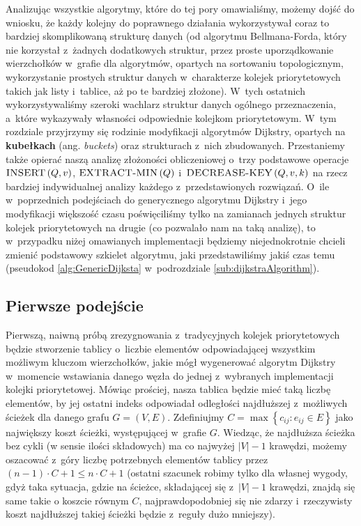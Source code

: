 Analizując wszystkie algorytmy, które do tej pory omawialiśmy, możemy dojść do wniosku, że każdy kolejny do poprawnego działania wykorzystywał coraz to bardziej skomplikowaną strukturę danych (od algorytmu Bellmana-Forda, który nie korzystał z~żadnych dodatkowych struktur, przez proste uporządkowanie wierzchołków w~grafie dla algorytmów, opartych na sortowaniu topologicznym, wykorzystanie prostych struktur danych w~charakterze kolejek priorytetowych takich jak listy i~tablice, aż po te bardziej złożone). W~tych ostatnich wykorzystywaliśmy szeroki wachlarz struktur danych ogólnego przeznaczenia, a~które wykazywały własności odpowiednie kolejkom priorytetowym. W~tym rozdziale przyjrzymy się rodzinie modyfikacji algorytmów Dijkstry, opartych na \textbf{kubełkach} (ang. \textit{buckets}) oraz strukturach z~nich zbudowanych. Przestaniemy także opierać naszą analizę złożoności obliczeniowej o~trzy podstawowe operacje $\textrm{\textsc{INSERT}} \left( Q, v \right)$, $\textrm{\textsc{EXTRACT-MIN}} \left( Q \right)$ i~$\textrm{\textsc{DECREASE-KEY}} \left( Q, v, k \right)$ na rzecz bardziej indywidualnej analizy każdego z~przedstawionych rozwiązań. O~ile w~poprzednich podejściach do  generycznego algorytmu Dijkstry i~jego modyfikacji większość czasu poświęciliśmy tylko na zamianach jednych struktur kolejek priorytetowych na drugie (co pozwalało nam na taką analizę), to w~przypadku niżej omawianych implementacji będziemy niejednokrotnie chcieli zmienić podstawowy szkielet algorytmu, jaki przedstawiliśmy jakiś czas temu (pseudokod \ref{alg:GenericDijksta} w~podrozdziale \ref{sub:dijkstraAlgorithm}).

\subsection{Pierwsze podejście}

Pierwszą, naiwną próbą zrezygnowania z~tradycyjnych kolejek priorytetowych będzie stworzenie tablicy o~liczbie elementów odpowiadającej wszystkim możliwym kluczom wierzchołków, jakie mógł wygenerować algorytm Dijkstry w~momencie wstawiania danego węzła do jednej z~wybranych implementacji kolejki priorytetowej. Mówiąc prościej, nasza tablica będzie mieć taką liczbę elementów, by jej ostatni indeks odpowiadał odległości najdłuższej z~możliwych ścieżek dla danego grafu $G = \left( V, E \right)$. Zdefiniujmy $C = \max \left\{ c_{ij} : e_{ij} \in E \right\}$ jako największy koszt ścieżki, występującej w~grafie $G$. Wiedząc, że najdłuższa ścieżka bez cykli (w sensie ilości składowych) ma co najwyżej $ \left| V \right| - 1 $ krawędzi, możemy oszacować z~góry liczbę potrzebnych elementów tablicy przez $ \left( n - 1 \right) \cdot C + 1 \leqslant n \cdot C + 1$ (ostatni szacunek robimy tylko dla własnej wygody, gdyż taka sytuacja, gdzie na ścieżce, składającej się z~$ \left| V \right| - 1 $ krawędzi, znajdą się same takie o koszcie równym $C$, najprawdopodobniej się nie zdarzy i~rzeczywisty koszt najdłuższej takiej ścieżki będzie z~reguły dużo mniejszy).


